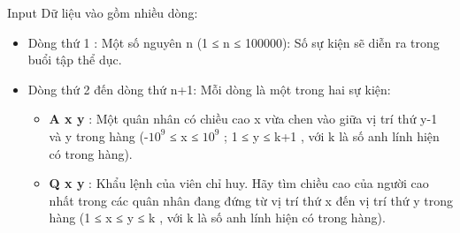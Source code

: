 Input
Dữ liệu vào gồm nhiều dòng:  
\begin{itemize}
	\item     Dòng thứ 1 : Một số nguyên n (1 ≤ n ≤ 100000): Số sự kiện sẽ diễn ra trong buổi tập thể dục.   
	\item     Dòng thứ 2 đến dòng thứ n+1: Mỗi dòng là một trong hai sự kiện:    
\begin{itemize}
	\item \textbf{       A x y      }      : Một quân nhân có chiều cao x vừa chen vào giữa vị trí thứ y-1 và y trong hàng (-$10^{9}$      ≤ x ≤ $10^{9}$      ; 1 ≤ y ≤ k+1 , với k là số anh lính hiện có trong hàng).     
	\item \textbf{       Q x y      }      : Khẩu lệnh của viên chỉ huy. Hãy tìm chiều cao của người cao nhất trong các quân nhân đang đứng từ vị trí thứ x đến vị trí thứ y trong hàng (1 ≤ x ≤ y ≤ k , với k là số anh lính hiện có trong hàng).     
\end{itemize}
\end{itemize}